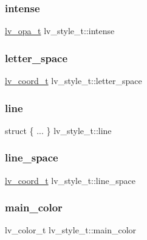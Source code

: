 \subsubsection{\texorpdfstring{intense}{intense}}
{\footnotesize\ttfamily \mbox{\hyperlink{lv__color_8h_acdb0f6245624d86b1cb002186fd6cf96}{lv\+\_\+opa\+\_\+t}} lv\+\_\+style\+\_\+t\+::intense}

\mbox{\label{structlv__style__t_addd784b6cb6aa74d79b351785baa7111}} 
\subsubsection{\texorpdfstring{letter\_space}{letter\_space}}
{\footnotesize\ttfamily \mbox{\hyperlink{lv__area_8h_ad98932f5017f20988532bb68b32a6d76}{lv\+\_\+coord\+\_\+t}} lv\+\_\+style\+\_\+t\+::letter\+\_\+space}

\mbox{\label{structlv__style__t_af9d426aaa11de96a9a1eb709fd44228e}} 
\subsubsection{\texorpdfstring{line}{line}}
{\footnotesize\ttfamily struct \{ ... \}   lv\+\_\+style\+\_\+t\+::line}

\mbox{\label{structlv__style__t_acabd5fc81255ae839cbe085ff0322161}} 
\subsubsection{\texorpdfstring{line\_space}{line\_space}}
{\footnotesize\ttfamily \mbox{\hyperlink{lv__area_8h_ad98932f5017f20988532bb68b32a6d76}{lv\+\_\+coord\+\_\+t}} lv\+\_\+style\+\_\+t\+::line\+\_\+space}

\mbox{\label{structlv__style__t_abd9695a53c65094e64a1e6e83f8c4d20}} 
\subsubsection{\texorpdfstring{main\_color}{main\_color}}
{\footnotesize\ttfamily lv\+\_\+color\+\_\+t lv\+\_\+style\+\_\+t\+::main\+\_\+color}

